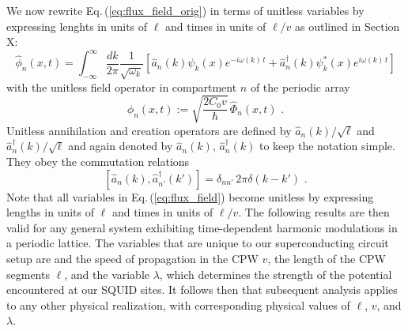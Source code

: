 We now rewrite Eq.\,(\ref{eq:flux_field_orig}) in terms of unitless variables 
by expressing lenghts in units of $\ell$ and times in units of $\ell/v$
as outlined in \color{red} Section X:  \color{black}  
%
\begin{equation} \label{eq:flux_field}
    \hat{\phi}_n(x,t) = 
    \int_{-\infty}^{\infty}\frac{dk}{2 \pi} \frac{1}{\sqrt{\omega_k}}
    \left[ \hat{a}_n(k) \psi_k(x)e^{-i \omega(k) \, t} + 
    \hat{a}_n^{\dagger}(k) \psi_k^*(x) e^{i \omega(k) \, t} \right]
\end{equation}
%
with the unitless field operator in compartment $n$ of the periodic array
%
\begin{equation} \label{eq:ufo}
\hat{\phi}_n(x,t) := \sqrt{\frac{2 C_0 v}{\hbar}} \, \hat{\Phi}_n(x,t) \, \, .
\end{equation}
%
Unitless annihilation and creation operators are defined by $\hat{a}_n(k)/\sqrt{\ell}$ 
and ${\hat a}_{n}^\dagger(k) / \sqrt{\ell}$ and again denoted by
$\hat{a}_n(k)$, ${\hat a}_{n}^\dagger(k)$ to keep the notation simple. 
They obey the commutation relations 
%
\begin{equation} \label{eq:cra}
    \left[ \hat{a}_n(k),{\hat a}_{n'}^\dagger(k') \right] = \delta_{nn'} \, 2 \pi \delta(k - k') \, \, .
\end{equation}
%
Note that all variables in Eq.\,(\ref{eq:flux_field}) become unitless by expressing lengths in units of $\ell$ and times in units of $\ell/v$. The following results are then valid for any general system exhibiting time-dependent harmonic modulations in a periodic lattice. The variables that are unique to our superconducting circuit setup are and the speed of propagation in the CPW $v$, the length of the CPW segments $\ell$, and the variable $\lambda$, which determines the strength of the potential encountered at our SQUID sites. It follows then that subsequent analysis applies to any other physical realization, with corresponding physical values of $\ell$, $v$, and $\lambda$.

